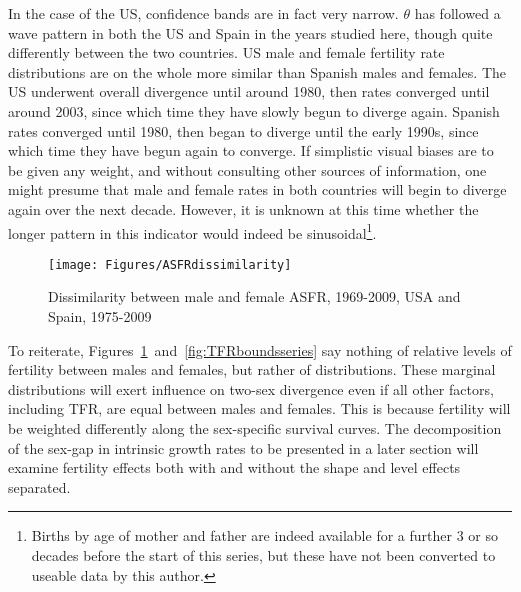 In the case of the US, confidence bands are in fact very narrow. $\theta$ has followed
a wave pattern in both the US and Spain in the years studied here, though 
quite differently between the two countries. US male and female fertility rate
distributions are on the whole more similar than Spanish males and females. The
US underwent overall divergence until around 1980, then rates converged until
around 2003, since which time they have slowly begun to diverge again. Spanish
rates converged until 1980, then began to diverge until the early 1990s, since
which time they have begun again to converge. If simplistic visual biases are to
be given any weight, and without consulting other sources of information, one
might presume that male and female rates in both countries will begin to diverge
again over the next decade. However, it is unknown at this time whether the
longer pattern in this indicator would indeed be sinusoidal\footnote{Births by
age of mother and father are indeed available for a further 3 or so decades
before the start of this series, but these have not been converted to
useable data by this author.}.

\begin{figure}[ht!]
        \centering  
          \caption{Dissimilarity between male and female ASFR, 1969-2009, USA
          and Spain, 1975-2009}
           \texttt{[image: Figures/ASFRdissimilarity]}
          \label{fig:ASFRdissimilarity}
\end{figure}

To reiterate, Figures~\ref{fig:ASFRdissimilarity}~and~\ref{fig:TFRboundsseries}
say nothing of relative levels of fertility between males and females, but
rather of distributions. These marginal distributions will exert influence on
two-sex divergence even if all other factors, including TFR, are equal between
males and females. This is because fertility will be weighted differently along
the sex-specific survival curves. The decomposition of the sex-gap in
intrinsic growth rates to be presented in a later section will examine fertility
effects both with and without the shape and level effects separated.

 \FloatBarrier